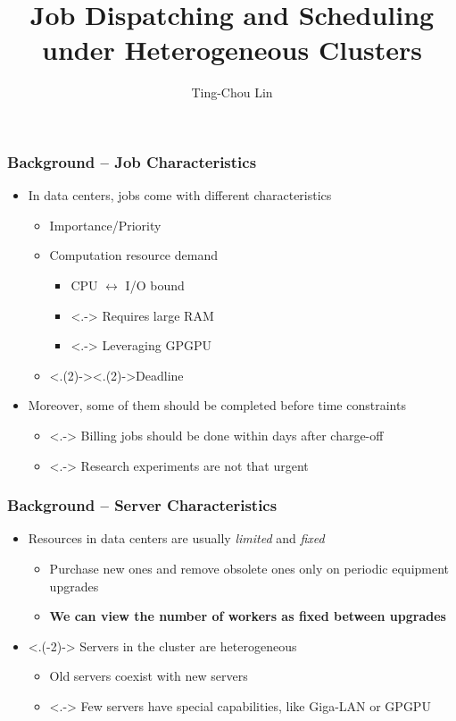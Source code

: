\documentclass{beamer}
\title{Job Dispatching and Scheduling under Heterogeneous Clusters}
\author{Ting-Chou Lin}
\begin{document}
\begin{frame}
  \titlepage
  \label{title-page}
\end{frame}
\begin{frame}
  \frametitle{Background -- Job Characteristics}
  \begin{itemize}[<+->]
    \item In data centers, jobs come with different characteristics
      \begin{itemize}
        \item Importance/Priority
        \item Computation resource demand
          \begin{itemize}
            \item CPU $\leftrightarrow$ I/O bound
            \item <.-> Requires large RAM
            \item <.-> Leveraging GPGPU
          \end{itemize}
        \item <.(2)->{\alert<.(2)->{Deadline}}
      \end{itemize}
    \item Moreover, some of them should be completed before time
      constraints
      \begin{itemize}
        \item <.-> Billing jobs should be done within days after charge-off
        \item <.-> Research experiments are not that urgent
      \end{itemize}
  \end{itemize}
\end{frame}
\begin{frame} [<+->]
  \frametitle{Background -- Server Characteristics}
  \begin{itemize}
    \item Resources in data centers are usually \emph{limited} and
      \emph{fixed}
      \begin{itemize}
        \item Purchase new ones and remove obsolete ones only on
          periodic equipment upgrades
        \item \textbf{We can view the number of workers as fixed between
          upgrades}
      \end{itemize}
    \item <.(-2)-> Servers in the cluster are \alert{heterogeneous}
      \begin{itemize}
        \item Old servers coexist with new servers
        \item <.-> Few servers have special capabilities, like Giga-LAN
          or GPGPU
      \end{itemize}
  \end{itemize}
\end{frame}
\end{document}
